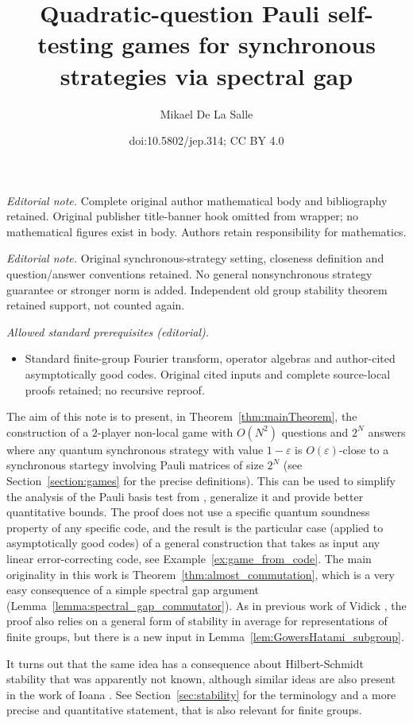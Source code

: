 \documentclass[10pt]{amsart}
\title{Quadratic-question Pauli self-testing games for synchronous strategies via spectral gap}
\author{Mikael De La Salle}
\date{doi:10.5802/jep.314; CC BY 4.0}
\theoremstyle{plain}
\theoremstyle{definition}
\begin{document}
\maketitle
\noindent\textit{Editorial note.} Complete original author mathematical body and bibliography retained. Original publisher title-banner hook omitted from wrapper; no mathematical figures exist in body. Authors retain responsibility for mathematics.\par\medskip
\noindent\textit{Editorial note.} Original synchronous-strategy setting, closeness definition and question/answer conventions retained. No general nonsynchronous strategy guarantee or stronger norm is added. Independent old group stability theorem retained support, not counted again.\par\medskip
\noindent\textit{Allowed standard prerequisites (editorial).}\begin{itemize}
\item Standard finite-group Fourier transform, operator algebras and author-cited asymptotically good codes. Original cited inputs and complete source-local proofs retained; no recursive reproof.
\end{itemize}\medskip
The aim of this note is to present, in Theorem~\ref{thm:mainTheorem}, the construction of a $2$\nobreakdash-player non-local game with $O(N^2)$ questions and $2^N$ answers where any quantum synchronous strategy with value $1-\varepsilon$ is $O(\varepsilon)$-close to a synchronous startegy involving Pauli matrices of size $2^N$ (see Section~\ref{section:games} for the precise definitions). This can be used to simplify the analysis of the Pauli basis test from \cite{MIPRE}, generalize it and provide better quantitative bounds. The proof does not use a specific quantum soundness property of any specific code, and the result is the particular case (applied to asymptotically good codes) of a general construction that takes as input any linear error-correcting code, see Example~\ref{ex:game_from_code}. The main originality in this work is Theorem~\ref{thm:almost_commutation}, which is a very easy consequence of a simple spectral gap argument (Lemma~\ref{lemma:spectral_gap_commutator}). As in previous work of Vidick \cite{vidickPauliBraiding}, the proof also relies on a general form of stability in average for representations of finite groups, but there is a new input in Lemma~\ref{lem:GowersHatami_subgroup}.

It turns out that the same idea has a consequence about Hilbert-Schmidt stability that was apparently not known, although similar ideas are also present in the work of Ioana \cite{MR4134896}. See Section~\ref{sec:stability} for the terminology and a more precise and quantitative statement, that is also relevant for finite groups.
\end{document}
